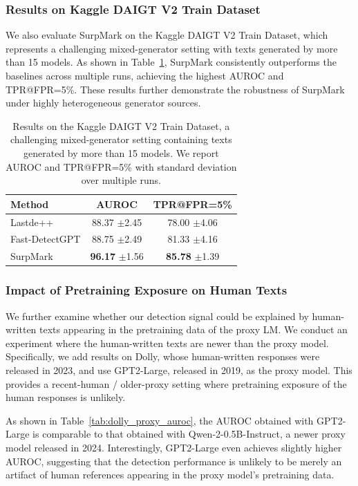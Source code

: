 \documentclass{article}
\newcommand{\com}[1]{\tiny$\pm$#1}
\theoremstyle{plain}
\theoremstyle{definition}
\theoremstyle{remark}
\begin{document}
\subsubsection{Results on Kaggle DAIGT V2 Train Dataset}
We also evaluate SurpMark on the Kaggle DAIGT V2 Train Dataset, which represents a challenging mixed-generator setting with texts generated by more than 15 models. 
As shown in Table~\ref{tab:daigt_v2}, SurpMark consistently outperforms the baselines across multiple runs, achieving the highest AUROC and TPR@FPR=5\%. 
These results further demonstrate the robustness of SurpMark under highly heterogeneous generator sources.
\begin{table}[htbp]
\centering
\caption{Results on the Kaggle DAIGT V2 Train Dataset, a challenging mixed-generator setting containing texts generated by more than 15 models. We report AUROC and TPR@FPR=5\% with standard deviation over multiple runs.}
\label{tab:daigt_v2}
{\scriptsize
\begin{tabular}{lcc}
\toprule
Method & AUROC & TPR@FPR=5\%  \\
\midrule
Lastde++ & 88.37 \com 2.45 & 78.00 \com 4.06 \\
Fast-DetectGPT & 88.75 \com 2.49 & 81.33 \com 4.16 \\
SurpMark & \textbf{96.17} \com 1.56 & \textbf{85.78} \com 1.39 \\
\bottomrule
\end{tabular}}
\end{table}

\subsubsection{\quad Impact of Pretraining Exposure on Human Texts} \label{app:pretraining_contamination}

We further examine whether our detection signal could be explained by human-written texts appearing in the pretraining data of the proxy LM. 
We conduct an experiment where the human-written texts are newer than the proxy model. 
Specifically, we add results on Dolly, whose human-written responses were released in 2023, and use GPT2-Large, released in 2019, as the proxy model. 
This provides a recent-human / older-proxy setting where pretraining exposure of the human responses is unlikely.

As shown in Table~\ref{tab:dolly_proxy_auroc}, the AUROC obtained with GPT2-Large is comparable to that obtained with Qwen-2-0.5B-Instruct, a newer proxy model released in 2024. 
Interestingly, GPT2-Large even achieves slightly higher AUROC, suggesting that the detection performance is unlikely to be merely an artifact of human references appearing in the proxy model’s pretraining data.
\end{document}
